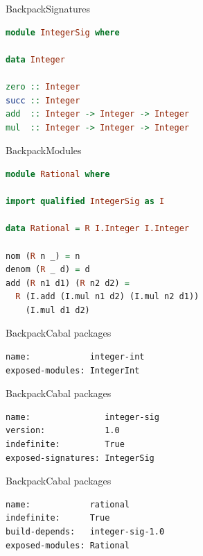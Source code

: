 \documentclass{beamer}
\begin{document}
\begin{frame}[fragile]{Backpack}{Signatures}
\begin{lstlisting}[language=Haskell]
module IntegerSig where

data Integer

zero :: Integer
succ :: Integer
add  :: Integer -> Integer -> Integer
mul  :: Integer -> Integer -> Integer
\end{lstlisting}
\end{frame}

\begin{frame}[fragile]{Backpack}{Modules}
\begin{lstlisting}[language=Haskell]
module Rational where

import qualified IntegerSig as I

data Rational = R I.Integer I.Integer

nom (R n _) = n
denom (R _ d) = d
add (R n1 d1) (R n2 d2) =
  R (I.add (I.mul n1 d2) (I.mul n2 d1))
    (I.mul d1 d2)
\end{lstlisting}
\end{frame}

\begin{frame}[fragile]{Backpack}{Cabal packages}
\begin{lstlisting}[language=Cabal,title=Integer implementation package]
name:            integer-int
exposed-modules: IntegerInt
\end{lstlisting}
\end{frame}

\begin{frame}[fragile]{Backpack}{Cabal packages}
\begin{lstlisting}[language=Cabal,title=Integer signature package]
name:               integer-sig
version:            1.0
indefinite:         True
exposed-signatures: IntegerSig
\end{lstlisting}
\end{frame}

\begin{frame}[fragile]{Backpack}{Cabal packages}
\begin{lstlisting}[language=Cabal,title=Rational ``functor'' package]
name:            rational
indefinite:      True
build-depends:   integer-sig-1.0
exposed-modules: Rational
\end{lstlisting}
\end{frame}
\end{document}

